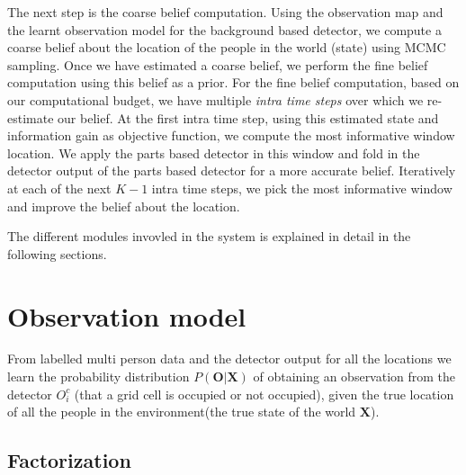 \documentclass[10pt,twocolumn,letterpaper]{article}
\begin{document}
The next step is the coarse belief computation. Using the observation map and the learnt observation model for the background based detector, we compute a coarse belief about the location of the people in the world (state) using MCMC sampling.
Once we have estimated a coarse belief, we perform the fine belief computation using this belief as a prior.
For the fine belief computation, based on our computational budget, we have multiple \emph{intra time steps} over which we re-estimate our belief. 
At the first intra time step, using this estimated state and information gain as objective function, we compute the most informative window location.
We apply the parts based detector in this window and fold in the detector output of the parts based detector for a more accurate belief.
Iteratively at each of the next $K-1$ intra time steps, we pick the most informative window and improve the belief about the location.

The different modules invovled in the system is explained in detail in the following sections.

\section{Observation model}
From labelled multi person data and the detector output for all the locations we learn the probability distribution $ P(\textbf{O}|\textbf{X})  $ of
obtaining an observation from the detector $ O^{c}_{i} $ (that a grid cell is occupied or not occupied), given the true location of all the people in the environment(the true state of the world $\textbf{X}$).

\subsection{Factorization}
\end{document}
